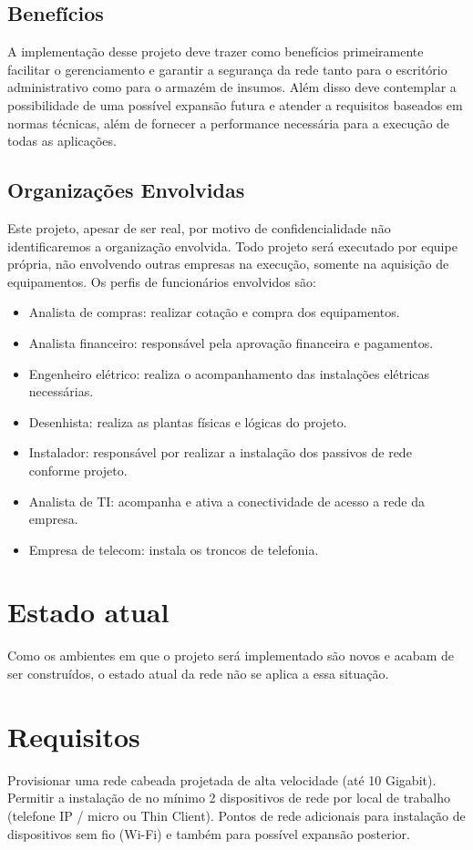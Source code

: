 \documentclass[	DIV=calc,%
							paper=a4,%
							fontsize=12pt,%
							onecolumn]{scrartcl}	 					%
\begin{document}
\subsection{Benefícios}
A implementação desse projeto deve trazer como benefícios primeiramente facilitar o gerenciamento e garantir a segurança da rede tanto para o escritório administrativo como para o armazém de insumos. Além disso deve contemplar a possibilidade de uma possível expansão futura e atender a requisitos baseados em normas técnicas, além de fornecer a performance necessária para a execução de todas as aplicações.

\subsection{Organizações Envolvidas}
Este projeto, apesar de ser real, por motivo de confidencialidade não identificaremos a organização envolvida. Todo projeto será executado por equipe própria, não envolvendo outras empresas na execução, somente na aquisição de equipamentos. Os perfis de funcionários envolvidos são:
\begin{itemize}
	\item Analista de compras: realizar cotação e compra dos equipamentos. 
	\item Analista financeiro: responsável pela aprovação financeira e pagamentos.
	\item Engenheiro elétrico: realiza o acompanhamento das instalações elétricas necessárias. 
	\item Desenhista: realiza as plantas físicas e lógicas do projeto. 
	\item Instalador: responsável por realizar a instalação dos passivos de rede conforme projeto. 
	\item Analista de TI: acompanha e ativa a conectividade de acesso a rede da empresa. 
	\item Empresa de telecom: instala os troncos de telefonia.  
\end{itemize}


\section{Estado atual}
Como os ambientes em que o projeto será implementado são novos e acabam de ser construídos, o estado atual da rede não se aplica a essa situação. 

\section{Requisitos}
Provisionar uma rede cabeada projetada de alta velocidade (até 10 Gigabit). Permitir a instalação de no mínimo 2 dispositivos de rede por local de trabalho (telefone IP / micro ou Thin Client). Pontos de rede adicionais para instalação de dispositivos sem fio (Wi-Fi) e também para possível expansão posterior. 
\end{document}
